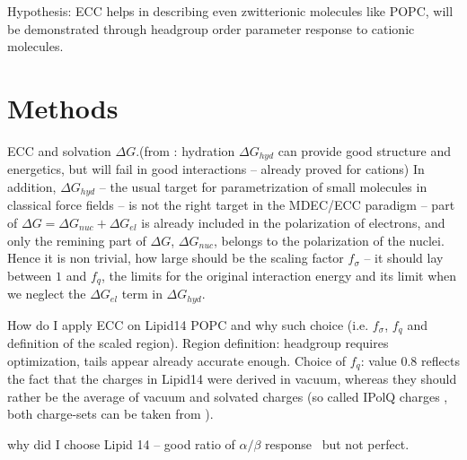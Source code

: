 \documentclass[aip,jcp,twocolumn]{revtex4}
\begin{document}
Hypothesis: ECC helps in describing even zwitterionic molecules like POPC, will be demonstrated through headgroup order parameter response to cationic molecules.

\section{Methods}

ECC and solvation $\Delta G$.(from \cite{leontyev11} : hydration $\Delta  G_{hyd}$ can provide good structure and energetics, but will fail in good interactions -- already proved for cations)
In addition, $\Delta G_{hyd}$ -- the usual target for parametrization of small molecules in classical force fields -- is not the right target in the MDEC/ECC paradigm -- part of $\Delta G = \Delta G_{nuc} + \Delta G_{el}$ is already included in the polarization of electrons, and only the remining part of $\Delta G$,  $\Delta G_{nuc}$, belongs to the polarization of the nuclei. 
Hence it is non trivial, how large should be the scaling factor $f_\sigma$ -- it should lay between $1$ and $f_q$, the limits for the original interaction energy and its limit when we neglect the $\Delta G_{el}$ term in $\Delta G_{hyd}$. 

How do I apply ECC on Lipid14 POPC and why such choice (i.e. $f_\sigma$, $f_q$ and definition of the scaled region).
Region definition: headgroup requires optimization, tails appear already accurate enough. 
Choice of $f_q$: value 0.8 reflects the fact that the charges in Lipid14 were derived in vacuum, whereas they should rather be the average of vacuum and solvated charges (so called IPolQ charges \cite{Cerutti2013}, both charge-sets can be taken from \cite{maciejewski14}). 

why did I choose Lipid 14 -- good ratio of $\alpha / \beta$ response~\cite{catte16} but not perfect.
\end{document}
